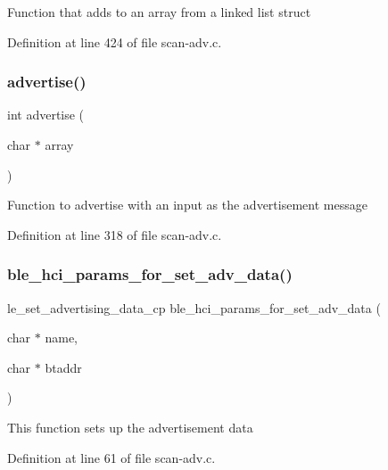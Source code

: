 Function that adds to an array from a linked list struct 

Definition at line 424 of file scan-\/adv.\+c.

\mbox{\label{scan-adv_8c_af336b7876acfc459f4ff1a871ba9aab9}} 
\subsubsection{\texorpdfstring{advertise()}{advertise()}}
{\footnotesize\ttfamily int advertise (\begin{DoxyParamCaption}\item[{char $\ast$}]{array }\end{DoxyParamCaption})}

Function to advertise with an input as the advertisement message 

Definition at line 318 of file scan-\/adv.\+c.

\mbox{\label{scan-adv_8c_a220489d8e27cddcc092f9adc7eeb5540}} 
\subsubsection{\texorpdfstring{ble\+\_\+hci\+\_\+params\+\_\+for\+\_\+set\+\_\+adv\+\_\+data()}{ble\_hci\_params\_for\_set\_adv\_data()}}
{\footnotesize\ttfamily le\+\_\+set\+\_\+advertising\+\_\+data\+\_\+cp ble\+\_\+hci\+\_\+params\+\_\+for\+\_\+set\+\_\+adv\+\_\+data (\begin{DoxyParamCaption}\item[{char $\ast$}]{name,  }\item[{char $\ast$}]{btaddr }\end{DoxyParamCaption})}

This function sets up the advertisement data 

Definition at line 61 of file scan-\/adv.\+c.

\mbox{\label{scan-adv_8c_a1c2cdca7577ed9775b53dbee4b82c28b}} 
